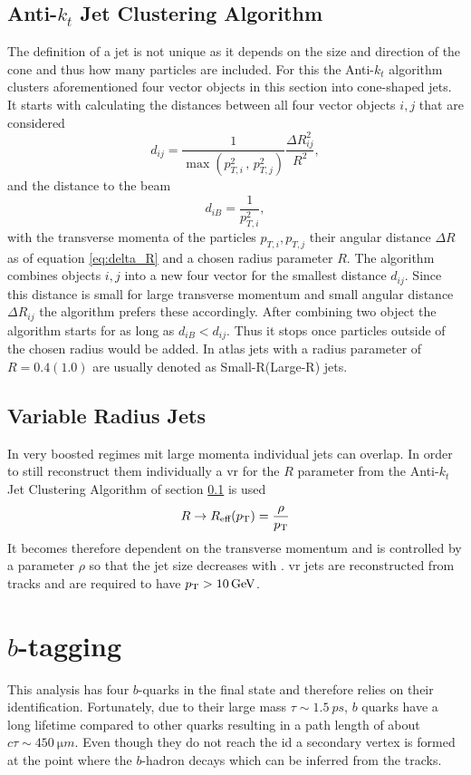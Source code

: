 \subsection{Anti-$k_t$ Jet Clustering Algorithm}\label{sec:anti_kt}
The definition of a jet is not unique as it depends on the size and direction of the cone and thus how many particles are included. For this the Anti-$k_t$ algorithm \citep{cacciari2008anti} clusters aforementioned four vector objects in this section into cone-shaped jets. It starts with calculating the distances between all four vector objects $i,j$ that are considered
\begin{equation}
  d_{ij}=\frac{1}{\max(p_{T,i}^{2}\,,\,p_{T,j}^{2})} \frac{\Delta R_{ij}^2}{R^2},
\end{equation}
and the distance to the beam
\begin{equation}
  d_{iB}=\frac{1}{p_{T,i}^{2}},
\end{equation}
with the transverse momenta of the particles $p_{T,i},p_{T,j}$ their angular distance $\Delta R$ as of equation \ref{eq:delta_R} and a chosen radius parameter $R$. The algorithm combines objects $i,j$ into a new four vector for the smallest distance $d_{ij}$. Since this distance is small for large transverse momentum \pt and small angular distance $\Delta R_{ij}$ the algorithm prefers these accordingly. After combining two object the algorithm starts for as long as $d_{iB}<d_{ij}$. Thus it stops once particles outside of the chosen radius would be added. In \ac{atlas} jets with  a radius parameter of $R=0.4 (1.0)$ are usually denoted as Small-R(Large-R) jets.


\subsection{Variable Radius Jets}\label{sec:vr_jets}
In very boosted regimes mit large momenta individual jets can overlap. In order to still reconstruct them individually a \ac{vr} for the $R$ parameter from the Anti-$k_t$ Jet Clustering Algorithm of section \ref{sec:anti_kt} is used
\begin{equation}
  R\rightarrow R_\text{eff}(p_{\text{T}})=\frac{\rho}{p_{\text{T}}}
\end{equation}
It becomes therefore dependent on the transverse momentum and is controlled by a parameter $\rho$ so that the jet size decreases with \pt. \ac{vr} jets are reconstructed from tracks and are required to have $p_{\text{T}}>\qty[]{10}{GeV}$.

\section{$b$-tagging}\label{sec:b_tagging}
This analysis has four $b$-quarks in the final state and therefore relies on their identification.  Fortunately, due to their large mass $\tau\sim\qty{1.5}{ps}$, $b$ quarks have a long lifetime compared to other quarks resulting in a path length of about $c\tau\sim\qty{450}{\micro m}$. Even though they do not reach the \ac{id} a secondary vertex is formed at the point where the $b$-hadron decays which can be inferred from the tracks.

